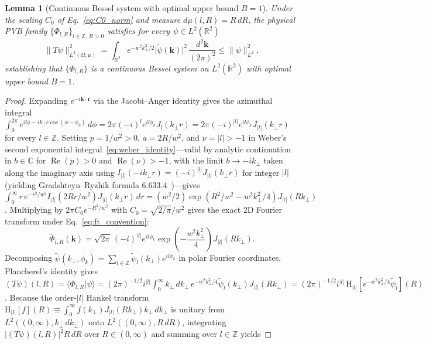 \documentclass[aps,pra,onecolumn,notitlepage,11pt,tightenlines,nofootinbib,floatfix,longbibliography]{revtex4-2}
\newtheorem{lemma}{Lemma}
\theoremstyle{remark}
\newcommand{\braket}[2]{\langle #1 | #2 \rangle}
\newcommand{\norm}[1]{\lVert #1 \rVert}
\newcommand{\abs}[1]{\lvert #1 \rvert}
\begin{document}
\begin{lemma}[Continuous Bessel system with optimal upper bound $B=1$]
\label{lem:bessel_upper}
Under the scaling $C_0$ of Eq.~\eqref{eq:C0_norm} and measure \mbox{$d\mu(l,R) = R\,dR$}, the physical PVB family $\{\Phi_{l,R}\}_{l\in\mathbb{Z},\,R>0}$ satisfies for every $\psi \in L^2(\mathbb{R}^2)$
\begin{equation}
\norm{T\psi}_{L^2(\Omega,\mu)}^2 = \int_{\mathbb{R}^2} e^{-w^2 k_\perp^2/2}\abs{\widetilde{\psi}(\mathbf{k})}^2\,\frac{d^2\mathbf{k}}{(2\pi)^2} \le \norm{\psi}_{L^2}^2,
\label{eq:bessel_lemma}
\end{equation}
establishing that $\{\Phi_{l,R}\}$ is a continuous Bessel system on $L^2(\mathbb{R}^2)$ with optimal upper bound $B = 1$.
\end{lemma}
\begin{proof}
Expanding $e^{-i\mathbf{k}\cdot\mathbf{r}}$ via the Jacobi--Anger identity gives the azimuthal integral $\int_0^{2\pi} e^{il\phi - ik_\perp r\cos(\phi-\phi_k)}\,d\phi = 2\pi (-i)^l e^{il\phi_k} J_l(k_\perp r) = 2\pi (-i)^{\abs{l}} e^{il\phi_k} J_{\abs{l}}(k_\perp r)$ for every $l \in \mathbb{Z}$. Setting $p = 1/w^2 > 0$, $a = 2R/w^2$, and $\nu = \abs{l} > -1$ in Weber's second exponential integral~\eqref{eq:weber_identity}---valid by analytic continuation in $b \in \mathbb{C}$ for $\operatorname{Re}(p) > 0$ and $\operatorname{Re}(\nu) > -1$, with the limit $b \to -i k_\perp$ taken along the imaginary axis using $I_{\abs{l}}(-i k_\perp r) = (-i)^{\abs{l}} J_{\abs{l}}(k_\perp r)$ for integer $\abs{l}$ (yielding Gradshteyn--Ryzhik formula 6.633.4~\cite{Gradshteyn2014})---gives $\int_0^\infty r\,e^{-r^2/w^2} I_{\abs{l}}(2Rr/w^2) J_{\abs{l}}(k_\perp r)\,dr = (w^2/2)\exp(R^2/w^2 - w^2 k_\perp^2/4) J_{\abs{l}}(R k_\perp)$. Multiplying by $2\pi C_0 e^{-R^2/w^2}$ with $C_0 = \sqrt{2/\pi}/w^2$ gives the exact 2D Fourier transform under Eq.~\eqref{eq:ft_convention}:
\begin{equation}
\widetilde{\Phi}_{l,R}(\mathbf{k}) = \sqrt{2\pi}\,(-i)^{\abs{l}} e^{il\phi_k} \exp\!\left(-\frac{w^2 k_\perp^2}{4}\right) J_{\abs{l}}(R k_\perp).
\label{eq:pvb_ft}
\end{equation}
Decomposing $\widetilde{\psi}(k_\perp,\phi_k) = \sum_{l\in\mathbb{Z}} \widetilde{\psi}_l(k_\perp)e^{il\phi_k}$ in polar Fourier coordinates, Plancherel's identity gives $(T\psi)(l,R) = \braket{\Phi_{l,R}}{\psi} = (2\pi)^{-1/2} i^{\abs{l}} \allowbreak \int_0^\infty k_\perp\,dk_\perp\, \allowbreak e^{-w^2 k_\perp^2/4}\widetilde{\psi}_l(k_\perp) J_{\abs{l}}(Rk_\perp) = (2\pi)^{-1/2} i^{\abs{l}}\,\mathrm{H}_{\abs{l}}[e^{-w^2 k_\perp^2/4}\widetilde{\psi}_l](R)$. Because the order-$\abs{l}$ Hankel transform $\mathrm{H}_{\abs{l}}[f](R) \equiv \int_0^\infty f(k_\perp) J_{\abs{l}}(R k_\perp) k_\perp\,dk_\perp$ is unitary from $L^2((0,\infty), k_\perp\,dk_\perp)$ onto $L^2((0,\infty), R\,dR)$, integrating $\abs{(T\psi)(l,R)}^2 R\,dR$ over $R \in (0,\infty)$ and summing over $l \in \mathbb{Z}$ yields

\end{proof}
\end{document}
